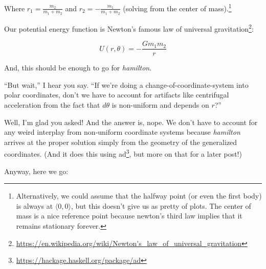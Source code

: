 \documentclass[]{article}
\renewcommand{\href}[2]{#2\footnote{\url{#1}}}
\begin{document}
Where \(r_1 = \frac{m_2}{m_1 + m_2}\) and \(r_2 = - \frac{m_1}{m_1 + m_2}\)
(solving from the center of mass).\footnote{Alternatively, we could assume that
  the halfway point (or even the first body) is always at
  \(\langle 0, 0 \rangle\), but this doesn't give us as pretty of plots. The
  center of mass is a nice reference point because newton's third law implies
  that it remains stationary forever.}

Our potential energy function is Newton's famous
\href{https://en.wikipedia.org/wiki/Newton's_law_of_universal_gravitation}{law
of universal gravitation}:

\[
U(r, \theta) = - \frac{G m_1 m_2}{r}
\]

And, this should be enough to go for \emph{hamilton}.

``But wait,'' I hear you say. ``If we're doing a change-of-coordinate-system
into polar coordinates, don't we have to account for artifacts like centrifugal
acceleration from the fact that \(d \theta\) is non-uniform and depends on
\(r\)?''

Well, I'm glad you asked! And the answer is, nope. We don't have to account for
any weird interplay from non-uniform coordinate systems because \emph{hamilton}
arrives at the proper solution simply from the geometry of the generalized
coordinates. (And it does this using
\href{https://hackage.haskell.org/package/ad}{ad}, but more on that for a later
post!)

Anyway, here we go:
\end{document}

